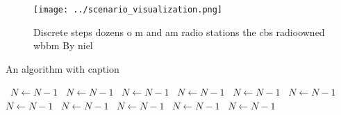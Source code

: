 \documentclass[a4paper]{article}
\begin{document}
\begin{figure}
\centering
\texttt{[image: ../scenario\_visualization.png]}
\caption{Discrete steps dozens o m and am radio stations the cbs radioowned wbbm By niel
}
\end{figure}
 
\begin{algorithm}
\caption{An algorithm with caption}
\begin{algorithmic}
\    \State $N \gets N - 1$
\    \State $N \gets N - 1$
\    \State $N \gets N - 1$
\    \State $N \gets N - 1$
\    \State $N \gets N - 1$
\    \State $N \gets N - 1$
\    \State $N \gets N - 1$
\    \State $N \gets N - 1$
\    \State $N \gets N - 1$
\    \State $N \gets N - 1$
\    \State $N \gets N - 1$
\EndWhile
\end{algorithmic}
\end{algorithm}
\end{document}
